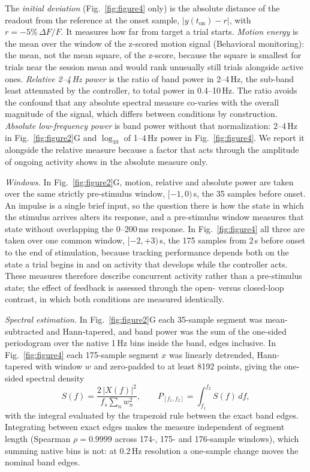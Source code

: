 The \emph{initial deviation} (Fig.~\ref{fig:figure4} only) is the absolute
distance of the readout from the reference at the onset sample,
$\lvert y(t_{\mathrm{on}}) - r \rvert$, with $r = -5\%\,\Delta F/F$. It measures
how far from target a trial starts. \emph{Motion energy} is the mean over the
window of the z-scored motion signal (Behavioral monitoring): the mean, not the
mean square, of the z-score, because the square is smallest for trials near the
session mean and would rank unusually still trials alongside active ones.
\emph{Relative 2--4\,Hz power} is the ratio of band power in 2--4\,Hz, the
sub-band least attenuated by the controller, to total power in 0.4--10\,Hz. The
ratio avoids the confound that any absolute spectral measure co-varies with the
overall magnitude of the signal, which differs between conditions by
construction. \emph{Absolute low-frequency power} is band power without that
normalization: 2--4\,Hz in Fig.~\ref{fig:figure2}G and $\log_{10}$ of 1--4\,Hz
power in Fig.~\ref{fig:figure4}. We report it alongside the relative measure
because a factor that acts through the amplitude of ongoing activity shows in the
absolute measure only.

\emph{Windows.} In Fig.~\ref{fig:figure2}G, motion, relative and absolute power
are taken over the same strictly pre-stimulus window, $[-1, 0)$\,s, the 35
samples before onset. An impulse is a single brief input, so the question there
is how the state in which the stimulus arrives alters its response, and a
pre-stimulus window measures that state without overlapping the 0--200\,ms
response. In Fig.~\ref{fig:figure4} all three are taken over one common window,
$[-2, +3)$\,s, the 175 samples from 2\,s before onset to the end of
stimulation, because tracking performance depends both on the state a trial
begins in and on activity that develops while the controller acts. These
measures therefore describe concurrent activity rather than a pre-stimulus
state; the effect of feedback is assessed through the open- versus closed-loop
contrast, in which both conditions are measured identically.

\emph{Spectral estimation.} In Fig.~\ref{fig:figure2}G each 35-sample segment was
mean-subtracted and Hann-tapered, and band power was the sum of the one-sided
periodogram over the native 1\,Hz bins inside the band, edges inclusive. In
Fig.~\ref{fig:figure4} each 175-sample segment $x$ was linearly detrended,
Hann-tapered with window $w$ and zero-padded to at least 8192 points, giving the
one-sided spectral density
%
\begin{equation}
    S(f) = \frac{2\,\lvert X(f) \rvert^{2}}{f_{s} \sum_{n} w_{n}^{2}},
    \qquad
    P_{[f_1, f_2]} = \int_{f_1}^{f_2} S(f)\,df ,
    \label{eq:bandpow}
\end{equation}
%
with the integral evaluated by the trapezoid rule between the exact band edges.
Integrating between exact edges makes the measure independent of segment length
(Spearman $\rho = 0.9999$ across 174-, 175- and 176-sample windows), which
summing native bins is not: at 0.2\,Hz resolution a one-sample change moves the
nominal band edges.

